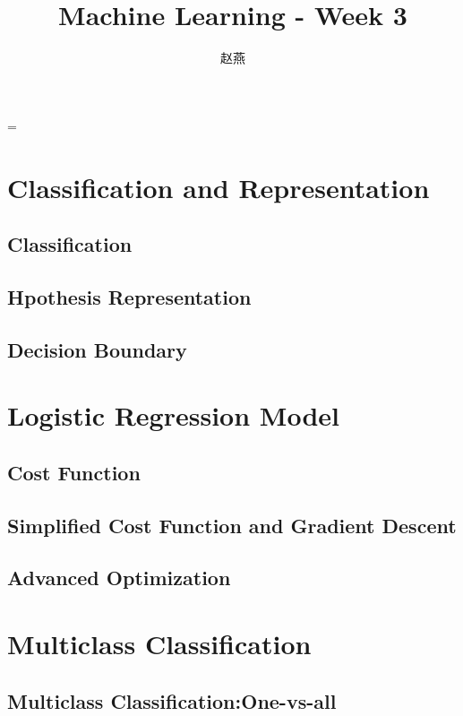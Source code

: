 \documentclass{article}
\title{Machine Learning - Week 3}
\author{赵燕}
\date{}
\begin{document}
 
\hfuzz=\maxdimen
{}
\begin{CJK}{UTF8}{gbsn} 
\maketitle
\renewcommand\contentsname{目录}
\renewcommand\figurename{图}
\tableofcontents
\newpage

\section{Classification and Representation}
\subsection{Classification}
\subsection{Hpothesis Representation}
\subsection{Decision Boundary}
\section{Logistic Regression Model}
\subsection{Cost Function}
\subsection{Simplified Cost Function and Gradient Descent}
\subsection{Advanced Optimization}
\section{Multiclass Classification}
\subsection{Multiclass Classification:One-vs-all}
\subparagraph*{}
\end{CJK}
\end{document}

